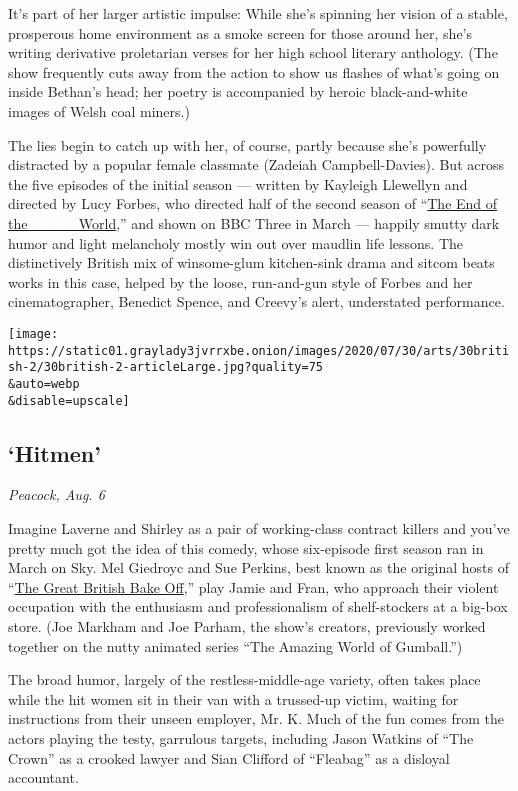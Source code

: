 It's part of her larger artistic impulse: While she's spinning her
vision of a stable, prosperous home environment as a smoke screen for
those around her, she's writing derivative proletarian verses for her
high school literary anthology. (The show frequently cuts away from the
action to show us flashes of what's going on inside Bethan's head; her
poetry is accompanied by heroic black-and-white images of Welsh coal
miners.)

The lies begin to catch up with her, of course, partly because she's
powerfully distracted by a popular female classmate (Zadeiah
Campbell-Davies). But across the five episodes of the initial season ---
written by Kayleigh Llewellyn and directed by Lucy Forbes, who directed
half of the second season of
``\href{https://www.nytimes3xbfgragh.onion/2019/11/04/arts/television/review-the-end-of-the-world-netflix.html}{The
End of the \_\_\_\_ World},'' and shown on BBC Three in March ---
happily smutty dark humor and light melancholy mostly win out over
maudlin life lessons. The distinctively British mix of winsome-glum
kitchen-sink drama and sitcom beats works in this case, helped by the
loose, run-and-gun style of Forbes and her cinematographer, Benedict
Spence, and Creevy's alert, understated performance.

\texttt{[image: https://static01.graylady3jvrrxbe.onion/images/2020/07/30/arts/30british-2/30british-2-articleLarge.jpg?quality=75\\\&auto=webp\\\&disable=upscale]}

\hypertarget{hitmen}{%
\subsection{`Hitmen'}\label{hitmen}}

\emph{Peacock, Aug. 6}

Imagine Laverne and Shirley as a pair of working-class contract killers
and you've pretty much got the idea of this comedy, whose six-episode
first season ran in March on Sky. Mel Giedroyc and Sue Perkins, best
known as the original hosts of
``\href{https://www.nytimes3xbfgragh.onion/2016/09/14/business/media/great-british-bake-off-will-leave-bbc-for-rival.html}{The
Great British Bake Off},'' play Jamie and Fran, who approach their
violent occupation with the enthusiasm and professionalism of
shelf-stockers at a big-box store. (Joe Markham and Joe Parham, the
show's creators, previously worked together on the nutty animated series
``The Amazing World of Gumball.'')

The broad humor, largely of the restless-middle-age variety, often takes
place while the hit women sit in their van with a trussed-up victim,
waiting for instructions from their unseen employer, Mr. K. Much of the
fun comes from the actors playing the testy, garrulous targets,
including Jason Watkins of ``The Crown'' as a crooked lawyer and Sian
Clifford of ``Fleabag'' as a disloyal accountant.

